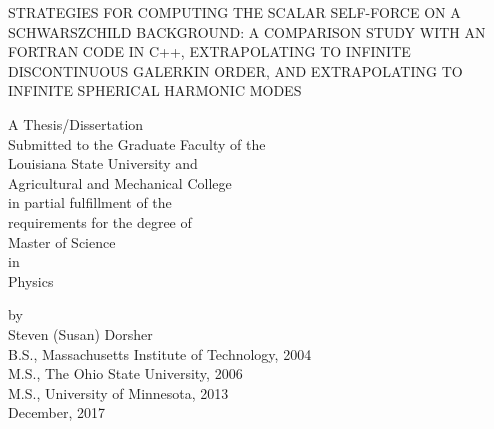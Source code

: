 \documentclass[12pt,letterpaper]{lsuetd}
\begin{document}
\renewcommand\@pnumwidth{1.55em}
\renewcommand\@tocrmarg{9.55em}
\renewcommand*\l@chapter{\@dottedtocline{0}{1.5em}{2.3em}}
\renewcommand*\l@figure{\@dottedtocline{1}{0em}{3.1em}}
\let\l@table\l@figure

\thispagestyle{empty}
\begin{center}
  STRATEGIES FOR COMPUTING THE SCALAR SELF-FORCE ON A SCHWARSZCHILD BACKGROUND: A COMPARISON STUDY WITH AN FORTRAN CODE IN C++, EXTRAPOLATING TO INFINITE DISCONTINUOUS GALERKIN ORDER, AND EXTRAPOLATING TO INFINITE SPHERICAL HARMONIC MODES

\vfill
\doublespacing
A Thesis/Dissertation \\
\singlespacing
Submitted to the Graduate Faculty of the \\
Louisiana State University and \\
Agricultural and Mechanical College \\
in partial fulfillment of the \\
requirements for the degree of \\
Master of Science\\
\doublespacing
in \\
                                       
Physics\\
\singlespacing
\vfill

by \\
Steven (Susan) Dorsher \\
B.S., Massachusetts Institute of Technology, 2004  \\
M.S., The Ohio State University, 2006  \\
M.S., University of Minnesota, 2013  \\
December, 2017
\end{center}
\pagebreak

\end{document}
